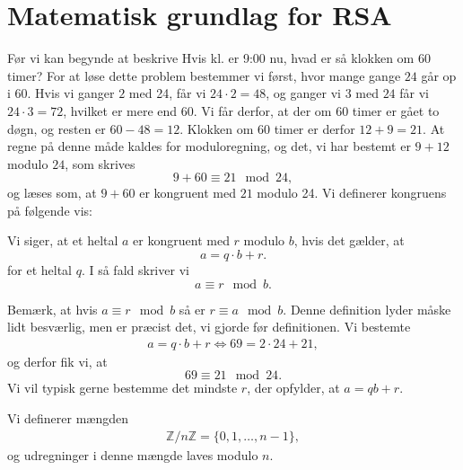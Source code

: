 \documentclass[12pt]{article}
\begin{document}
\section{Matematisk grundlag for RSA}
Før vi kan begynde at beskrive 
Hvis kl. er 9:00 nu, hvad er så klokken om 60 timer? For at løse dette problem bestemmer vi først, hvor mange gange $24$ går op i 60. Hvis vi ganger $2$ med 24, får vi $24\cdot 2 = 48$, og ganger vi $3$ med $24$ får vi $24 \cdot 3 = 72$, hvilket er mere end 60. Vi får derfor, at der om 60 timer er gået to døgn, og resten er $60-48 = 12$. Klokken om 60 timer er derfor $12+9 = 21$. At regne på denne måde kaldes for moduloregning, og det, vi har bestemt er $9 + 12$ modulo $24$, som skrives
\[
9+60 \equiv 21 \mod{24} ,
\]
og læses som, at $9+60$ er kongruent med $21$ modulo 24. 
Vi definerer kongruens på følgende vis:
\begin{defn}
Vi siger, at et heltal $a$ er kongruent med $r$ modulo $b$, hvis det gælder, at 
\[
a = q\cdot b + r.
\]
 for et heltal $q$. I så fald skriver vi
\[
a \equiv r \mod{b}. 
\]
\end{defn}
Bemærk, at hvis $a \equiv r \mod{b}$ så er $r \equiv a \mod{b}$. Denne definition lyder måske lidt besværlig, men er præcist det, vi gjorde før definitionen. Vi bestemte
\begin{align*}
a = q\cdot b + r \Leftrightarrow 69 = 2\cdot 24 + 21,
\end{align*}
og derfor fik vi, at 
\[
69 \equiv 21 \mod{24}.
\]
Vi vil typisk gerne bestemme det mindste $r$, der opfylder,  at $a = qb + r$. 
\begin{defn}
Vi definerer mængden 
\begin{align*}
\mathbb{Z}/n\mathbb{Z} = \{0,1,\hdots,n-1\},
\end{align*}
og udregninger i denne mængde laves modulo $n$.
\end{defn}
\end{document}
